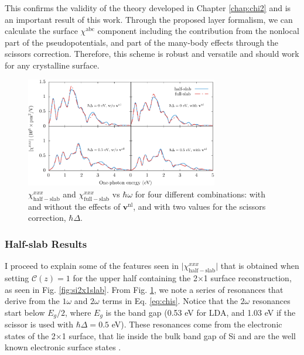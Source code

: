 This confirms the validity of the theory developed in Chapter \ref{chap:chi2}
and is an important result of this work. Through the proposed layer formalism,
we can calculate the surface $\chi^{\mathrm{abc}}$ component including the
contribution from the nonlocal part of the pseudopotentials, and part of the
many-body effects through the scissors correction. Therefore, this scheme is
robust and versatile and should work for any crystalline surface.

\begin{figure}[b]
\centering 
\includegraphics[width=0.75\textwidth]{content/figures/fig-Si2x1-hsvsfs}
\caption[Different scenarios of half-slab vs full-slab.]
{$\chi^{xxx}_{\mathrm{half-slab}}$ and $\chi^{xxx}_{\mathrm{full-slab}}$
vs $\hbar\omega$ for four different combinations: with and without the effects
of $\mathbf{v}^\mathrm{nl}$, and with two values for the scissors correction,
$\hbar\Delta$.}
\label{fig:hsvfs}
\end{figure}



\subsubsection{Half-slab Results}

I proceed to explain some of the features seen in
$\vert\chi^{xxx}_{\mathrm{half-slab}}\vert$ that is obtained when setting
$\mathbf{\mathcal{C}}(z) = 1$ for the upper half containing the 2$\times$1
surface reconstruction, as seen in Fig. \ref{fig:si2x1slab}. From Fig.
\ref{fig:hsvfs}, we note a series of resonances that derive from the $1\omega$
and $2\omega$ terms in Eq. \eqref{eq:chis}. Notice that the $2\omega$ resonances
start below $E_{g}/2$, where $E_{g}$ is the band gap (0.53 eV for LDA, and 1.03
eV if the scissor is used with $\hbar\Delta=0.5$ eV). These resonances come from
the electronic states of the 2$\times$1 surface, that lie inside the bulk band
gap of Si and are the well known electronic surface states \cite{rohlfingPRB95}.

